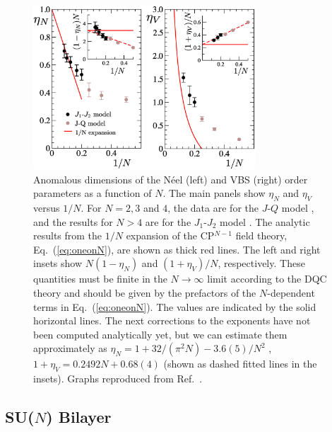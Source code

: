 \documentclass[10pt,pre,aps,twocolumn,showpacs,superscriptaddress,floatfix]{revtex4-1}
\begin{document}
\begin{figure}
\includegraphics[width=8.3cm, clip]{fig07.eps}
 \caption{ \label{fig:exp} Anomalous dimensions of the N\'eel (left) and VBS (right)
  order parameters as a function of $N$. The main panels show $\eta_N$ and $\eta_V$ versus $1/N$. For $N=2,3$ and $4$, the data are 
  for the $J$-$Q$ model \cite{lou2009:sun}, and the results for $N>4$ are for the $J_1$-$J_2$ model \cite{kaul2011:j1j2}. The analytic 
  results from the $1/N$ expansion of the CP$^{N-1}$ field theory, Eq.~(\ref{eq:oneonN}), are shown as thick red lines. The left and 
  right insets show $N(1-\eta_N)$ and $(1+\eta_V)/N$, respectively. These quantities must be finite in the  $N\rightarrow \infty$ 
  limit according to the DQC theory and should be given by the prefactors of the $N$-dependent terms in Eq.~(\ref{eq:oneonN}). The values
  are indicated by the solid horizontal lines. The next corrections to the exponents have not been computed analytically yet, but we can estimate 
  them approximately as $\eta_N = 1+32/(\pi^2 N)-3.6(5)/N^2$ , $1+\eta_V = 0.2492 N + 0.68(4)$ (shown as dashed fitted lines in the insets). 
  Graphs reproduced from Ref.~\cite{kaul2011:j1j2}.}
\end{figure}

\subsection{SU($N$) Bilayer}
\label{ss:bilN}
\end{document}
